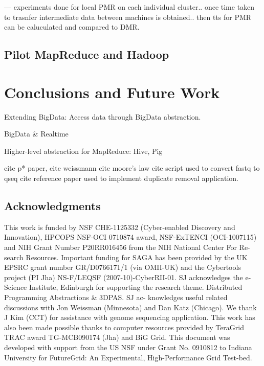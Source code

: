 \documentclass{acm_proc_article-sp}
\begin{document}
--- experiments done for local PMR on each individual cluster.. once time taken to trasnfer intermediate data between machines is obtained.. then tts for PMR can be caluculated and compared to DMR.

\subsection{Pilot MapReduce and Hadoop}


\section{Conclusions and Future Work}


Extending BigData: Access data through BigData abstraction.

BigData \& Realtime

Higher-level abstraction for MapReduce: Hive, Pig


%

%
%

cite p* paper,
cite weissmann
cite moore's law
cite script used to convert fastq to qseq
cite reference paper used to implement duplicate removal application.


\subsection*{Acknowledgments}
This work is funded by NSF CHE-1125332 (Cyber-enabled Discovery and
Innovation), HPCOPS NSF-OCI 0710874 award, NSF-ExTENCI (OCI-1007115) and NIH
Grant Number P20RR016456 from the NIH National Center For Re- search
Resources. Important funding for SAGA has been provided by the UK EPSRC grant
number GR/D0766171/1 (via OMII-UK) and the Cybertools project (PI Jha) 
NS-F/LEQSF (2007-10)-CyberRII-01. SJ acknowledges the e-Science Institute,
Edinburgh for supporting the research theme. Distributed Programming
Abstractions \& 3DPAS. SJ ac- knowledges useful related discussions with Jon
Weissman (Minnesota) and Dan Katz (Chicago). We thank J Kim (CCT) for
assistance with genome sequencing application. This work has also been made
possible thanks to computer resources provided by TeraGrid TRAC award
TG-MCB090174 (Jha) and BiG Grid. This document was developed with support from
the US NSF under Grant No. 0910812 to Indiana University for FutureGrid: An
Experimental, High-Performance Grid Test-bed.
\end{document}
